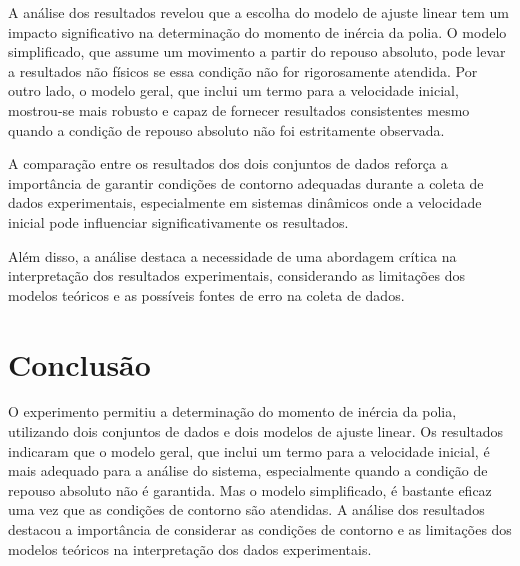 \documentclass[12pt,a4paper]{article}
\begin{document}
A análise dos resultados revelou que a escolha do modelo de ajuste linear tem um impacto significativo na determinação do momento de inércia da polia. O modelo simplificado, que assume um movimento a partir do repouso absoluto, pode levar a resultados não físicos se essa condição não for rigorosamente atendida. Por outro lado, o modelo geral, que inclui um termo para a velocidade inicial, mostrou-se mais robusto e capaz de fornecer resultados consistentes mesmo quando a condição de repouso absoluto não foi estritamente observada.

A comparação entre os resultados dos dois conjuntos de dados reforça a importância de garantir condições de contorno adequadas durante a coleta de dados experimentais, especialmente em sistemas dinâmicos onde a velocidade inicial pode influenciar significativamente os resultados. 

Além disso, a análise destaca a necessidade de uma abordagem crítica na interpretação dos resultados experimentais, considerando as limitações dos modelos teóricos e as possíveis fontes de erro na coleta de dados.

\section{Conclusão}

O experimento permitiu a determinação do momento de inércia da polia, utilizando dois conjuntos de dados e dois modelos de ajuste linear. Os resultados indicaram que o modelo geral, que inclui um termo para a velocidade inicial, é mais adequado para a análise do sistema, especialmente quando a condição de repouso absoluto não é garantida. Mas o modelo simplificado, é bastante eficaz uma vez que as condições de contorno são atendidas. A análise dos resultados destacou a importância de considerar as condições de contorno e as limitações dos modelos teóricos na interpretação dos dados experimentais.



\end{document}

